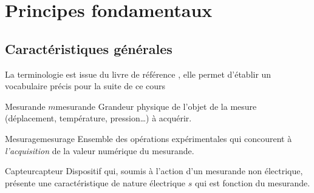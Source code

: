 

\begin{comment}

\documentclass[a4paper, 11pt, twoside, fleqn]{memoir}

\usepackage{AOCDTF}

\marqueurchapitre
\decoupagechapitre{1} %




	\openleft %

\end{comment}

\chapter{Principes fondamentaux}
\ChapFrame

\section{Caractéristiques générales}

La terminologie est issue du livre de référence \parencite{Asch2010}, elle permet d'établir un vocabulaire précis pour la suite de ce cours
\begin{definition}{Mesurande $m$}{mesurande}
Grandeur physique de l'objet de la mesure (déplacement, température, pression\ldots) à acquérir.
\end{definition} 
\begin{definition}{Mesurage}{mesurage}
Ensemble des opérations expérimentales qui concourent à \emph{l'acquisition} de la valeur numérique du mesurande.
\end{definition} 
\begin{definition}{Capteur}{capteur}
Dispositif qui, soumis à l'action d'un mesurande non électrique, présente une caractéristique de nature électrique $s$ qui est fonction du mesurande.
\end{definition} 

